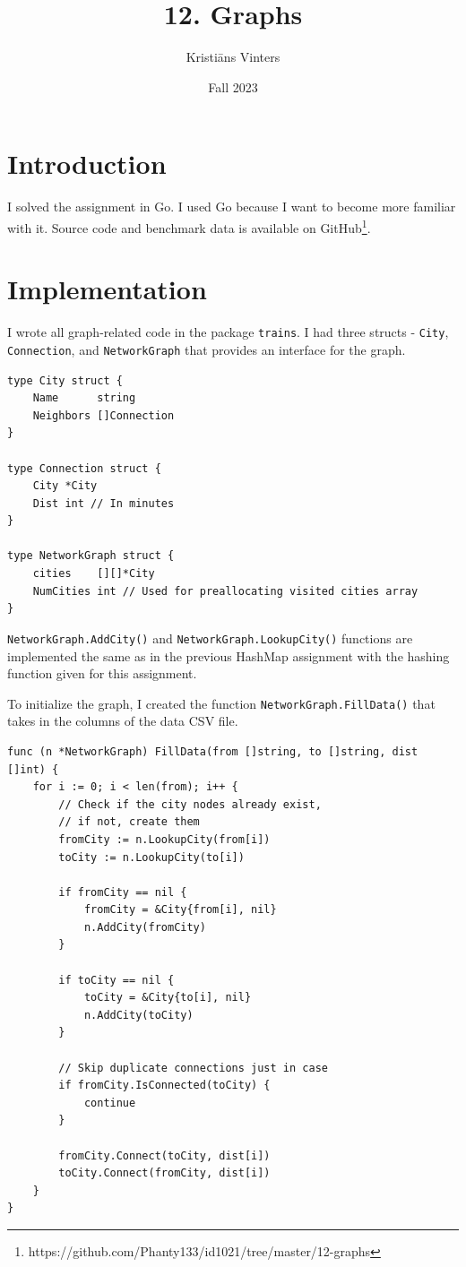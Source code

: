 \documentclass[a4paper,11pt]{article}
\title{\textbf{12. Graphs}}
\author{Kristiāns Vinters}
\date{Fall 2023}
\begin{document}
    \maketitle
    \section*{Introduction}

    I solved the assignment in Go. I used Go because I want to become more familiar with it. Source code and benchmark data is available on GitHub\footnote{https://github.com/Phanty133/id1021/tree/master/12-graphs}.

    \section*{Implementation}

    I wrote all graph-related code in the package \texttt{trains}. I had three structs - \texttt{City}, \texttt{Connection}, and \texttt{NetworkGraph} that provides an interface for the graph.

    \begin{verbatim}
type City struct {
    Name      string
    Neighbors []Connection
}

type Connection struct {
    City *City
    Dist int // In minutes
}

type NetworkGraph struct {
    cities    [][]*City
    NumCities int // Used for preallocating visited cities array
}
    \end{verbatim}

    \texttt{NetworkGraph.AddCity()} and \texttt{NetworkGraph.LookupCity()} functions are implemented the same as in the previous HashMap assignment with the hashing function given for this assignment.

    To initialize the graph, I created the function \texttt{NetworkGraph.FillData()} that takes in the columns of the data CSV file.

    \begin{verbatim}
func (n *NetworkGraph) FillData(from []string, to []string, dist []int) {
    for i := 0; i < len(from); i++ {
        // Check if the city nodes already exist,
        // if not, create them
        fromCity := n.LookupCity(from[i])
        toCity := n.LookupCity(to[i])

        if fromCity == nil {
            fromCity = &City{from[i], nil}
            n.AddCity(fromCity)
        }

        if toCity == nil {
            toCity = &City{to[i], nil}
            n.AddCity(toCity)
        }

        // Skip duplicate connections just in case
        if fromCity.IsConnected(toCity) {
            continue
        }

        fromCity.Connect(toCity, dist[i])
        toCity.Connect(fromCity, dist[i])
    }
}
    \end{verbatim}
\end{document}
